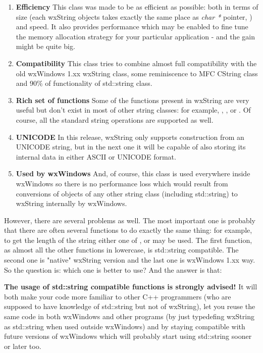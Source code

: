 \begin{enumerate}\itemsep=0pt
\item {\bf Efficiency} {This class was made to be as efficient as possible: both
in terms of size (each wxString objects takes exactly the same place as {\it
char *} pointer, ) and speed.
It also provides performance  
which may be enabled to fine tune the memory allocation strategy for your
particular application - and the gain might be quite big.}
\item {\bf Compatibility} {This class tries to combine almost full compatibility
with the old wxWindows 1.xx wxString class, some reminiscence to MFC CString
class and 90\% of functionality of std::string class.}
\item {\bf Rich set of functions} {Some of the functions present in wxString are
very useful but don't exist in most of other string classes: for example, 
, 
,  
or . Of course, all the standard string
operations are supported as well.}
\item {\bf UNICODE} {In this release, wxString only supports construction from
an UNICODE string, but in the next one it will be capable of also storing its
internal data in either ASCII or UNICODE format.}
\item {\bf Used by wxWindows} {And, of course, this class is used everywhere
inside wxWindows so there is no performance loss which would result from
conversions of objects of any other string class (including std::string) to
wxString internally by wxWindows.}
\end{enumerate}

However, there are several problems as well. The most important one is probably
that there are often several functions to do exactly the same thing: for
example, to get the length of the string either one of 
,  or
 may be used. The first function, as almost
all the other functions in lowercase, is std::string compatible. The second one
is "native" wxString version and the last one is wxWindows 1.xx way. So the
question is: which one is better to use? And the answer is that:

{\bf The usage of std::string compatible functions is strongly advised!} It will
both make your code more familiar to other C++ programmers (who are supposed to
have knowledge of std::string but not of wxString), let you reuse the same code
in both wxWindows and other programs (by just typedefing wxString as std::string
when used outside wxWindows) and by staying compatible with future versions of
wxWindows which will probably start using std::string sooner or later too.

